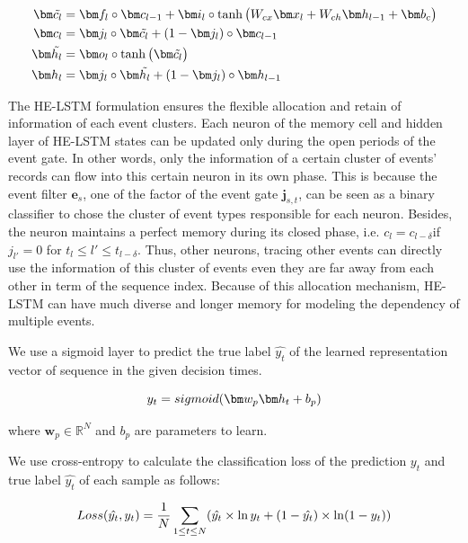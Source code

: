 \documentclass[letterpaper]{article} %
\begin{document}
\begin{align}
\setlength{\abovedisplayskip}{3pt}
\bm \tilde{c_l} &= \bm f_l \circ \bm c_{l-1} + \bm i_l \circ \tanh\big (W_{cx}\bm x_l+ W_{ch} \bm h_{l-1} + \bm b_c \big) \\
\bm c_l &= \bm j_l \circ \bm \tilde{c_l} + (1-\bm j_l) \circ \bm c_{l-1}\\
\bm \tilde{h_l} &= \bm o_l \circ \tanh \big( \bm \tilde{c_l} \big)\\
\bm h_l &= \bm j_l \circ \bm \tilde{h_l} + (1-\bm j_l) \circ \bm h_{l-1}
\setlength{\belowdisplayskip}{3pt}
\end{align}

The HE-LSTM formulation ensures
the flexible allocation and retain of information of each event clusters.
Each neuron of the memory cell and hidden layer of HE-LSTM states can be updated only during the open periods of the event gate. 
In other words, only the information of a certain cluster of events' records can flow into this certain neuron in its own phase.
This is because the event filter $\bm e_s$, one of the factor of the event gate $\bm j_{s,t}$, can be seen as a binary classifier to chose the cluster of event types responsible for each neuron.
Besides, the neuron maintains a perfect memory
during its closed phase, i.e. $c_l = c_{l-\delta} $if $j_{l'} = 0$ for $ t_l \leq  l' \leq t_{l-\delta}$. Thus, other neurons, tracing other events can directly use the information of this cluster of events even they are far away from each other in term of the sequence index. 
Because of this allocation mechanism, HE-LSTM can have much  diverse and longer memory for modeling the dependency of multiple events.



We use a sigmoid layer to predict the true label $\hat{y_t}$ of the  learned representation vector of sequence in the given decision times.

\begin{equation}
\setlength{\abovedisplayskip}{3pt}
y_t = sigmoid(\bm w_p  \bm h_t + b_p )
\setlength{\belowdisplayskip}{3pt}
\end{equation}


where $\bm w_p \in \mathbb{R}^N$ and $b_p$ are parameters to learn.


We use cross-entropy to calculate the classification
loss of the prediction $y_t$ and true label $\hat{y_t}$ of each sample as follows:

\begin{equation}
\setlength{\abovedisplayskip}{3pt}
Loss(\hat{y_t},y_t)
= \frac{1}{N}\sum_{1\leq t \leq N } ( \hat{y_t}\times \ln y_t  +(1-\hat{y_t})\times \ln(1-y_t))
\setlength{\belowdisplayskip}{3pt}
\end{equation}
\end{document}
